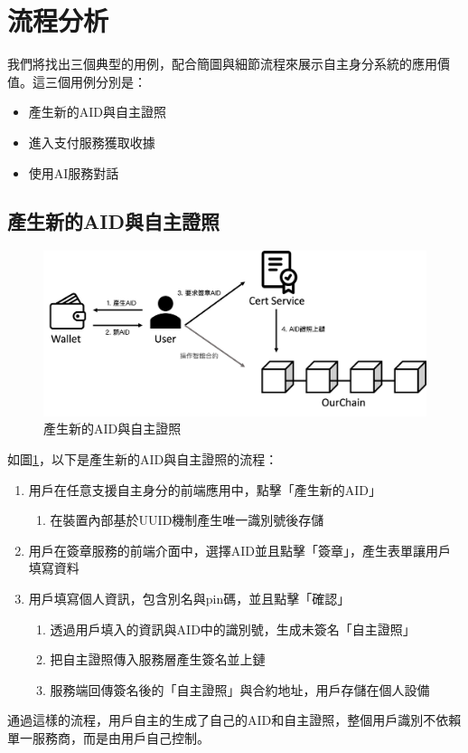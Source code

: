 \section{流程分析}
我們將找出三個典型的用例，配合簡圖與細節流程來展示自主身分系統的應用價值。這三個用例分別是：
\begin{itemize}
  \item 產生新的AID與自主證照
  \item 進入支付服務獲取收據
  \item 使用AI服務對話
\end{itemize}
\subsection{產生新的AID與自主證照}
\begin{figure}
  \centering
  \includegraphics[width=\linewidth, keepaspectratio]{figures/implement-1.png}
  \caption{產生新的AID與自主證照}
  \label{fig:implement-1}
\end{figure}
如圖\ref{fig:implement-1}，以下是產生新的AID與自主證照的流程：
\begin{enumerate}
  \item 用戶在任意支援自主身分的前端應用中，點擊「產生新的AID」
        \begin{enumerate}
          \item 在裝置內部基於UUID機制產生唯一識別號後存儲
        \end{enumerate}
  \item 用戶在簽章服務的前端介面中，選擇AID並且點擊「簽章」，產生表單讓用戶填寫資料
  \item 用戶填寫個人資訊，包含別名與pin碼，並且點擊「確認」
        \begin{enumerate}
          \item 透過用戶填入的資訊與AID中的識別號，生成未簽名「自主證照」
          \item 把自主證照傳入服務層產生簽名並上鏈
          \item 服務端回傳簽名後的「自主證照」與合約地址，用戶存儲在個人設備
        \end{enumerate}
\end{enumerate}
通過這樣的流程，用戶自主的生成了自己的AID和自主證照，整個用戶識別不依賴單一服務商，而是由用戶自己控制。
